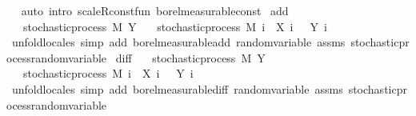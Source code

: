 \begin{isabellebody}
\isadelimproof
\ %
\endisadelimproof
%
\isatagproof
{}\isamarkupfalse%
\ {\isacharparenleft}{\kern0pt}auto\ intro{\isacharcolon}{\kern0pt}\ scaleR{\isacharunderscore}{\kern0pt}const{\isacharunderscore}{\kern0pt}fun\ borel{\isacharunderscore}{\kern0pt}measurable{\isacharunderscore}{\kern0pt}const{\isacharparenright}{\kern0pt}%
\endisatagproof
{\isafoldproof}%
%
\isadelimproof
%
\endisadelimproof
\isanewline
\isanewline
{}\isamarkupfalse%
\ add{\isacharcolon}{\kern0pt}\isanewline
\ \ \ {\isachardoublequoteopen}stochastic{\isacharunderscore}{\kern0pt}process\ M\ Y{\isachardoublequoteclose}\isanewline
\ \ \ {\isachardoublequoteopen}stochastic{\isacharunderscore}{\kern0pt}process\ M\ {\isacharparenleft}{\kern0pt}{\isasymlambda}i\ {\isasymxi}{\isachardot}{\kern0pt}\ X\ i\ {\isasymxi}\ {\isacharplus}{\kern0pt}\ Y\ i\ {\isasymxi}{\isacharparenright}{\kern0pt}{\isachardoublequoteclose}\isanewline
%
\isadelimproof
\ \ %
\endisadelimproof
%
\isatagproof
{}\isamarkupfalse%
\ {\isacharparenleft}{\kern0pt}unfold{\isacharunderscore}{\kern0pt}locales{\isacharparenright}{\kern0pt}\ {\isacharparenleft}{\kern0pt}simp\ add{\isacharcolon}{\kern0pt}\ borel{\isacharunderscore}{\kern0pt}measurable{\isacharunderscore}{\kern0pt}add\ random{\isacharunderscore}{\kern0pt}variable\ assms\ stochastic{\isacharunderscore}{\kern0pt}process{\isachardot}{\kern0pt}random{\isacharunderscore}{\kern0pt}variable{\isacharparenright}{\kern0pt}%
\endisatagproof
{\isafoldproof}%
%
\isadelimproof
\isanewline
%
\endisadelimproof
\isanewline
{}\isamarkupfalse%
\ diff{\isacharcolon}{\kern0pt}\isanewline
\ \ \ {\isachardoublequoteopen}stochastic{\isacharunderscore}{\kern0pt}process\ M\ Y{\isachardoublequoteclose}\isanewline
\ \ \ {\isachardoublequoteopen}stochastic{\isacharunderscore}{\kern0pt}process\ M\ {\isacharparenleft}{\kern0pt}{\isasymlambda}i\ {\isasymxi}{\isachardot}{\kern0pt}\ X\ i\ {\isasymxi}\ {\isacharminus}{\kern0pt}\ Y\ i\ {\isasymxi}{\isacharparenright}{\kern0pt}{\isachardoublequoteclose}\isanewline
%
\isadelimproof
\ \ %
\endisadelimproof
%
\isatagproof
{}\isamarkupfalse%
\ {\isacharparenleft}{\kern0pt}unfold{\isacharunderscore}{\kern0pt}locales{\isacharparenright}{\kern0pt}\ {\isacharparenleft}{\kern0pt}simp\ add{\isacharcolon}{\kern0pt}\ borel{\isacharunderscore}{\kern0pt}measurable{\isacharunderscore}{\kern0pt}diff\ random{\isacharunderscore}{\kern0pt}variable\ assms\ stochastic{\isacharunderscore}{\kern0pt}process{\isachardot}{\kern0pt}random{\isacharunderscore}{\kern0pt}variable{\isacharparenright}{\kern0pt}%

\end{isabellebody}
